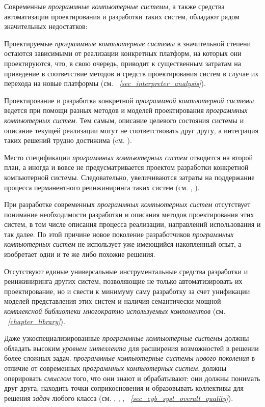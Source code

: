 Современные \textit{программные компьютерные системы}, а также средства автоматизации проектирования и разработки таких систем, обладают рядом значительных недостатков:

\begin{textitemize}
   \item Проектируемые \textit{программные компьютерные системы} в значительной степени остаются зависимыми от реализации конкретных платформ, на которых они проектируются, что, в свою очередь, приводит к существенным затратам на приведение в соответствие методов и средств проектирования систем в случае их перехода на новые платформы (см. \textit{~\ref{sec_interpreter_analysis}}).
   \item Проектирование и разработка конкретной \textit{программной компьютерной системы} ведется при помощи разных методов и моделей проектирования \textit{программных компьютерных систем}. Тем самым, описание целевого состояния системы и описание текущей реализации могут не соответствовать друг другу, а интеграция таких решений трудно достижима (cм. ).
   \item Место спецификации \textit{программных компьютерных систем} отводится на второй план, а иногда и вовсе не предусматривается проектом разработки конкретной компьютерной системы. Следовательно, увеличиваются затраты на поддержание процесса перманентного реинжиниринга таких систем (см. , ).
   \item При разработке современных \textit{программных компьютерных систем} отсутствует понимание необходимости разработки и описания методов проектирования этих систем, в том числе описания процесса реализации, направлений использования и так далее. По этой причине новое поколение разработчиков \textit{программных компьютерных систем} не использует уже имеющийся накопленный опыт, а изобретает одни и те же либо похожие решения.
   \item Отсутствуют единые универсальные инструментальные средства разработки и реинжиниринга других систем, позволяющие не только автоматизировать их проектирование, но и свести к минимуму саму разработку за счет унификации моделей представления этих систем и наличия семантически мощной \textit{комплексной библиотеки многократно используемых компонентов} (см. \textit{~\ref{chapter_library}}).
   \item Даже узкоспециализированные \textit{программные компьютерные системы} должны обладать высоким \textit{уровнем интеллекта} для расширения возможностей в решении более сложных задач. \textit{программные компьютерные системы нового поколения} в отличие от современных \textit{программных компьютерных систем}, должны оперировать \textit{смыслом} того, что они знают и обрабатывают: они должны понимать друг друга, находить точки соприкосновения и образовывать коллективы для решения \textit{задач} любого класса (см. , , , \textit{~\ref{sec_cyb_syst_overall_quality}}).

\end{textitemize}

